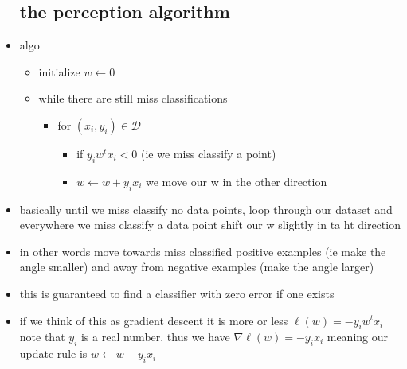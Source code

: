 \documentclass{article}
\begin{document}
\begin{itemize}
\subsection{the perception algorithm}
\item algo
\begin{itemize}
    \item initialize $w\leftarrow 0$
    \item while there are still miss classifications 
    \begin{itemize}
        \item for $(x_i,y_i)\in\mathcal{D}$
        \begin{itemize}
            \item if $y_iw^tx_i<0$ (ie we miss classify a point)
            \item $w \leftarrow w+y_ix_i$ we move our w in the other direction 
        \end{itemize}
    \end{itemize}
\end{itemize}
    \item basically until we miss classify no data points, loop through our dataset and everywhere we miss classify a data point shift our w slightly in ta ht direction 
    \item in other words move towards miss classified positive examples (ie make the angle smaller) and away from negative examples (make the angle larger)
    \item this is guaranteed to find a classifier with zero error if one exists 
    \item if we think of this as gradient descent it is more or less $\ell(w)=-y_iw^{t}x_i$ note that $y_i$ is a real number. thus we have $\nabla \ell(w)=-y_ix_i$
    meaning our update rule is $w\leftarrow w+y_ix_i$

\end{itemize}
\end{document}
